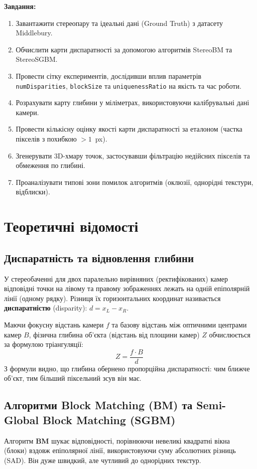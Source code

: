 \documentclass[a4paper,14pt]{extarticle}
\begin{document}
	\textbf{Завдання:}
	\begin{enumerate}
		\item Завантажити стереопару та ідеальні дані (Ground Truth) з датасету Middlebury.
		\item Обчислити карти диспаратності за допомогою алгоритмів StereoBM та StereoSGBM.
		\item Провести сітку експериментів, дослідивши вплив параметрів \texttt{numDisparities}, \texttt{blockSize} та \texttt{uniquenessRatio} на якість та час роботи.
		\item Розрахувати карту глибини у міліметрах, використовуючи калібрувальні дані камери.
		\item Провести кількісну оцінку якості карти диспаратності за еталоном (частка пікселів з похибкою $>1$~px).
		\item Згенерувати 3D-хмару точок, застосувавши фільтрацію недійсних пікселів та обмеження по глибині.
		\item Проаналізувати типові зони помилок алгоритмів (оклюзії, однорідні текстури, відблиски).
	\end{enumerate}
	
	\section{Теоретичні відомості}
	\subsection{Диспаратність та відновлення глибини}
	У стереобаченні для двох паралельно вирівняних (ректифікованих) камер відповідні точки на лівому та правому зображеннях лежать на одній епіполярній лінії (одному рядку). Різниця їх горизонтальних координат називається \textbf{диспаратністю} (disparity): $d = x_L - x_R$.
	
	Маючи фокусну відстань камери $f$ та базову відстань між оптичними центрами камер $B$, фізична глибина об'єкта (відстань від площини камер) $Z$ обчислюється за формулою тріангуляції:
	\begin{equation}
		Z = \frac{f \cdot B}{d}
	\end{equation}
	З формули видно, що глибина обернено пропорційна диспаратності: чим ближче об'єкт, тим більший піксельний зсув він має.
	
	\subsection{Алгоритми Block Matching (BM) та Semi-Global Block Matching (SGBM)}
	Алгоритм \textbf{BM} шукає відповідності, порівнюючи невеликі квадратні вікна (блоки) вздовж епіполярної лінії, використовуючи суму абсолютних різниць (SAD). Він дуже швидкий, але чутливий до однорідних текстур.
	
\end{document}
